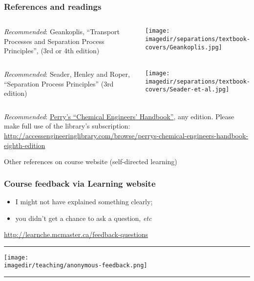 \begin{frame}\frametitle{References and readings}
	\vspace{12pt}
	\begin{columns}[t]
			\emph{Recommended}: Geankoplis, ``Transport Processes and Separation Process Principles'', (3rd or 4th edition)
			\vspace{-1cm}
			\begin{center}
				\texttt{[image: \\imagedir/separations/textbook-covers/Geankoplis.jpg]}
			\end{center}
	\end{columns}
	
	\vspace{12pt}
	\begin{columns}[t]
			\emph{Recommended}: Seader, Henley and Roper, ``Separation Process Principles'' (3rd edition)
			\vspace{-1cm}
			\begin{center}
				\texttt{[image: \\imagedir/separations/textbook-covers/Seader-et-al.jpg]}
			\end{center}
	\end{columns}
	\vspace{12pt}	
	\emph{Recommended}: \href{http://accessengineeringlibrary.com/browse/perrys-chemical-engineers-handbook-eighth-edition}{Perry's ``Chemical Engineers' Handbook''}, any edition. Please make full use of the library's subscription: \\
	\href{http://accessengineeringlibrary.com/browse/perrys-chemical-engineers-handbook-eighth-edition}{\tiny http://accessengineeringlibrary.com/browse/perrys-chemical-engineers-handbook-eighth-edition}
	
	\vspace{24pt}
	Other references on course website (self-directed learning)
	
\end{frame}

\begin{frame}\frametitle{Course feedback via Learning website}
	\begin{itemize}
		\item	I might not have explained something clearly; 
		\item	you didn't get a chance to ask a question, \emph{etc}		
	\end{itemize}
	\href{http://learnche.mcmaster.ca/feedback-questions}{http://learnche.mcmaster.ca/feedback-questions}
	\vspace{12pt}
	\hrule
	\begin{center}
		\texttt{[image: \\imagedir/teaching/anonymous-feedback.png]}
	\end{center}
	\hrule
\end{frame}

